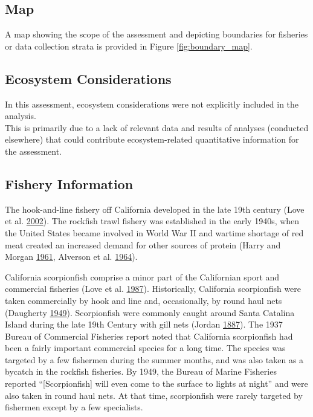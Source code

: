 \documentclass[12pt,]{article}
\begin{document}
\subsection{Map}\label{map}

A map showing the scope of the assessment and depicting boundaries for
fisheries or data collection strata is provided in Figure
\ref{fig:boundary_map}.

\subsection{Ecosystem Considerations}\label{ecosystem-considerations-1}

In this assessment, ecosystem considerations were not explicitly
included in the analysis.\\
This is primarily due to a lack of relevant data and results of analyses
(conducted elsewhere) that could contribute ecosystem-related
quantitative information for the assessment.

\subsection{Fishery Information}\label{fishery-information}

The hook-and-line fishery off California developed in the late 19th
century (Love et al. \protect\hyperlink{ref-Love2002}{2002}). The
rockfish trawl fishery was established in the early 1940s, when the
United States became involved in World War II and wartime shortage of
red meat created an increased demand for other sources of protein (Harry
and Morgan \protect\hyperlink{ref-Harry1961}{1961}, Alverson et al.
\protect\hyperlink{ref-Alverson1964}{1964}).

California scorpionfish comprise a minor part of the Californian sport
and commercial fisheries (Love et al.
\protect\hyperlink{ref-Love1987}{1987}). Historically, California
scorpionfish were taken commercially by hook and line and, occasionally,
by round haul nets (Daugherty
\protect\hyperlink{ref-Daugherty1949}{1949}). Scorpionfish were commonly
caught around Santa Catalina Island during the late 19th Century with
gill nets (Jordan \protect\hyperlink{ref-Jordan1887}{1887}). The 1937
Bureau of Commercial Fisheries report noted that California scorpionfish
had been a fairly important commercial species for a long time. The
species was targeted by a few fishermen during the summer months, and
was also taken as a bycatch in the rockfish fisheries. By 1949, the
Bureau of Marine Fisheries reported ``{[}Scorpionfish{]} will even come
to the surface to lights at night'' and were also taken in round haul
nets. At that time, scorpionfish were rarely targeted by fishermen
except by a few specialists.
\end{document}

